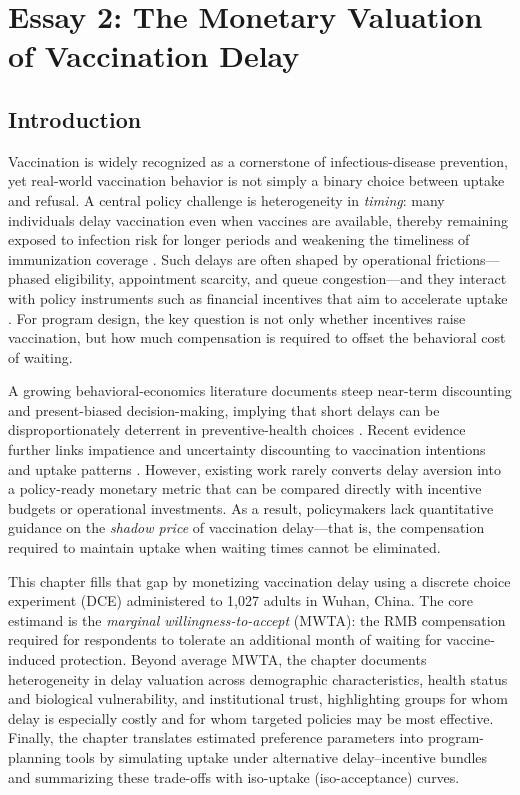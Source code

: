 \documentclass[doublespacing]{utdthesis}
\let\cite=\citep
\begin{document}
\clearpage

\chapter{Essay 2: The Monetary Valuation of Vaccination Delay}
\label{sec:essay2}

\section{Introduction}
\label{subsec:essay2_overview}

Vaccination is widely recognized as a cornerstone of infectious-disease prevention, yet real-world vaccination behavior is not simply a binary choice between uptake and refusal. A central policy challenge is heterogeneity in \emph{timing}: many individuals delay vaccination even when vaccines are available, thereby remaining exposed to infection risk for longer periods and weakening the timeliness of immunization coverage \cite{Hu2014,Smith2010}.
 Such delays are often shaped by operational frictions---phased eligibility, appointment scarcity, and queue congestion---and they interact with policy instruments such as financial incentives that aim to accelerate uptake \cite{Brewer2017}. For program design, the key question is not only whether incentives raise vaccination, but how much compensation is required to offset the behavioral cost of waiting.

A growing behavioral-economics literature documents steep near-term discounting and present-biased decision-making, implying that short delays can be disproportionately deterrent in preventive-health choices \cite{Frederick2002,Laibson1997,OR1999}. Recent evidence further links impatience and uncertainty discounting to vaccination intentions and uptake patterns \cite{Guillon2024}. However, existing work rarely converts delay aversion into a policy-ready monetary metric that can be compared directly with incentive budgets or operational investments. As a result, policymakers lack quantitative guidance on the \emph{shadow price} of vaccination delay---that is, the compensation required to maintain uptake when waiting times cannot be eliminated.

This chapter fills that gap by monetizing vaccination delay using a discrete choice experiment (DCE) administered to 1{,}027 adults in Wuhan, China. The core estimand is the \emph{marginal willingness-to-accept} (MWTA): the RMB compensation required for respondents to tolerate an additional month of waiting for vaccine-induced protection. Beyond average MWTA, the chapter documents heterogeneity in delay valuation across demographic characteristics, health status and biological vulnerability, and institutional trust, highlighting groups for whom delay is especially costly and for whom targeted policies may be most effective. Finally, the chapter translates estimated preference parameters into program-planning tools by simulating uptake under alternative delay--incentive bundles and summarizing these trade-offs with iso-uptake (iso-acceptance) curves.
\end{document}
